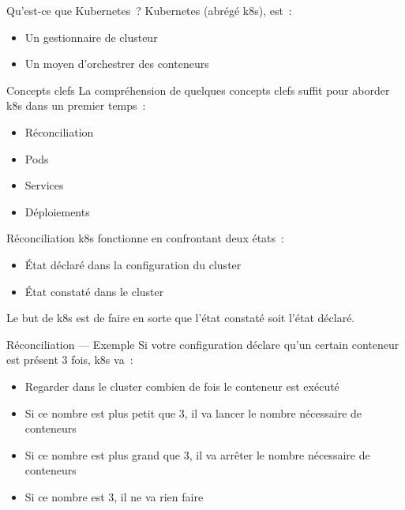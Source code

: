 \begin{frame}{Qu'est-ce que Kubernetes~?}
  Kubernetes (abrégé k8s), est~:
  \begin{itemize}
    \item Un gestionnaire de clusteur
    \item Un moyen d'orchestrer des conteneurs
  \end{itemize}
\end{frame}

\begin{frame}{Concepts clefs}
  La compréhension de quelques concepts clefs suffit pour aborder k8s dans un premier temps~:
  \begin{itemize}
    \item Réconciliation
    \item Pods
    \item Services
    \item Déploiements
  \end{itemize}
\end{frame}

\begin{frame}{Réconciliation}
  k8s fonctionne en confrontant deux états~:

  \begin{itemize}
    \item État déclaré dans la configuration du cluster
    \item État constaté dans le cluster
  \end{itemize}

  Le but de k8s est de faire en sorte que l'état constaté soit l'état déclaré.
\end{frame}

\begin{frame}{Réconciliation — Exemple}
  Si votre configuration déclare qu'un certain conteneur est présent 3 fois, k8s va~:

  \begin{itemize}
    \item Regarder dans le cluster combien de fois le conteneur est exécuté
    \item Si ce nombre est plus petit que 3, il va lancer le nombre nécessaire de conteneurs
    \item Si ce nombre est plus grand que 3, il va arrêter le nombre nécessaire de conteneurs
    \item Si ce nombre est 3, il ne va rien faire
  \end{itemize}
\end{frame}

